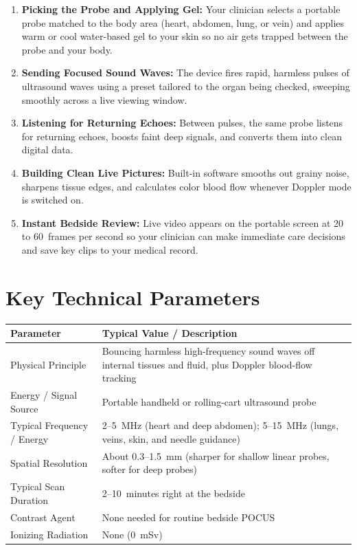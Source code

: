 \begin{enumerate}
    \item \textbf{Picking the Probe and Applying Gel:} Your clinician selects a portable probe matched to the body area (heart, abdomen, lung, or vein) and applies warm or cool water-based gel to your skin so no air gets trapped between the probe and your body.
    \item \textbf{Sending Focused Sound Waves:} The device fires rapid, harmless pulses of ultrasound waves using a preset tailored to the organ being checked, sweeping smoothly across a live viewing window.
    \item \textbf{Listening for Returning Echoes:} Between pulses, the same probe listens for returning echoes, boosts faint deep signals, and converts them into clean digital data.
    \item \textbf{Building Clean Live Pictures:} Built-in software smooths out grainy noise, sharpens tissue edges, and calculates color blood flow whenever Doppler mode is switched on.
    \item \textbf{Instant Bedside Review:} Live video appears on the portable screen at 20 to 60~frames per second so your clinician can make immediate care decisions and save key clips to your medical record.
\end{enumerate}

\section{Key Technical Parameters}

\noindent
\begin{tabularx}{\textwidth}{@{}l X@{}}
\toprule
\textbf{Parameter} & \textbf{Typical Value / Description} \\
\midrule
Physical Principle & Bouncing harmless high-frequency sound waves off internal tissues and fluid, plus Doppler blood-flow tracking \\
Energy / Signal Source & Portable handheld or rolling-cart ultrasound probe \\
Typical Frequency / Energy & 2--5~MHz (heart and deep abdomen); 5--15~MHz (lungs, veins, skin, and needle guidance) \\
Spatial Resolution & About 0.3--1.5~mm (sharper for shallow linear probes, softer for deep probes) \\
Typical Scan Duration & 2--10~minutes right at the bedside \\
Contrast Agent & None needed for routine bedside POCUS \\
Ionizing Radiation & None (0~mSv) \\
\bottomrule
\end{tabularx}

